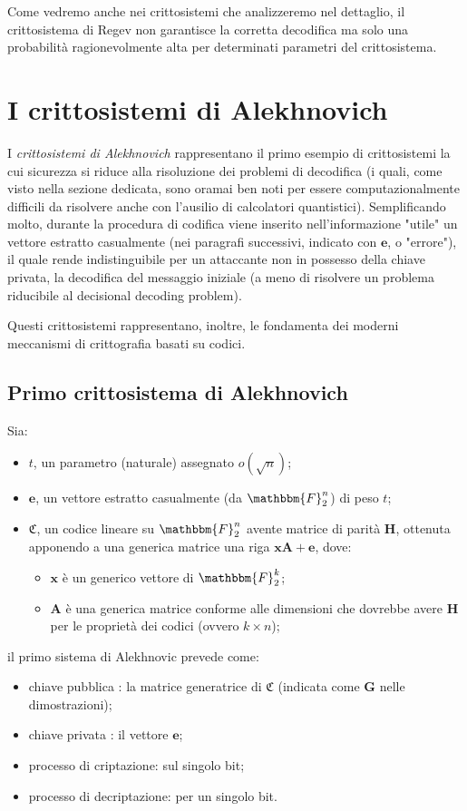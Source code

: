 \documentclass[12pt, a4paper]{report}
\theoremstyle{definition}
\begin{document}
				Come vedremo anche nei crittosistemi che analizzeremo nel dettaglio, il crittosistema di Regev non garantisce la corretta decodifica ma solo una probabilità ragionevolmente alta per determinati parametri del crittosistema.
	\chapter{I crittosistemi di Alekhnovich}
		I \emph{crittosistemi di Alekhnovich} rappresentano il primo esempio di crittosistemi la cui sicurezza si riduce alla risoluzione dei problemi di decodifica (i quali, come visto nella sezione dedicata, sono oramai ben noti per essere computazionalmente difficili da risolvere anche con l’ausilio di calcolatori quantistici). Semplificando molto, durante la procedura di codifica viene inserito nell'informazione "utile" un vettore estratto casualmente (nei paragrafi successivi, indicato con $\textbf{e}$, o "errore"), il quale rende indistinguibile per un attaccante non in possesso della chiave privata, la decodifica del messaggio iniziale (a meno di risolvere un problema riducibile al decisional decoding problem).
		
		Questi crittosistemi rappresentano, inoltre, le fondamenta dei moderni meccanismi di crittografia basati su codici.
		\section{Primo crittosistema di Alekhnovich \cite{7} \cite{9}}
			Sia:
			\begin{itemize}
				\item $t$, un parametro (naturale) assegnato $o(\sqrt{n})$;
				\item $\textbf{e}$, un vettore estratto casualmente (da $\mathbbm{F}_2^n$) di peso $t$;
				\item $\mathfrak{C}$, un codice lineare su $\mathbbm{F}_2^n$ avente matrice di parità $\mathbf{H}$, ottenuta apponendo a una generica matrice una riga $\textbf{x}\mathbf{A}+\textbf{e}$, dove:
				\begin{itemize}
					\item $\textbf{x}$ è un generico vettore di $\mathbbm{F}_2^k$;
					\item $\mathbf{A}$ è una generica matrice conforme alle dimensioni che dovrebbe avere $\mathbf{H}$ per le proprietà dei codici (ovvero $k\times n$);
				\end{itemize}
			\end{itemize}
			il primo sistema di Alekhnovic prevede come:
			\begin{itemize}
				\item chiave pubblica : la matrice generatrice di $\mathfrak{C}$ (indicata come $\mathbf{G}$ nelle dimostrazioni);
				\item chiave privata : il vettore $\textbf{e}$;
				\item processo di criptazione: sul singolo bit;
				\item processo di decriptazione: per un singolo bit.
			\end{itemize}
		\algOne
		\algTwo
\end{document}
